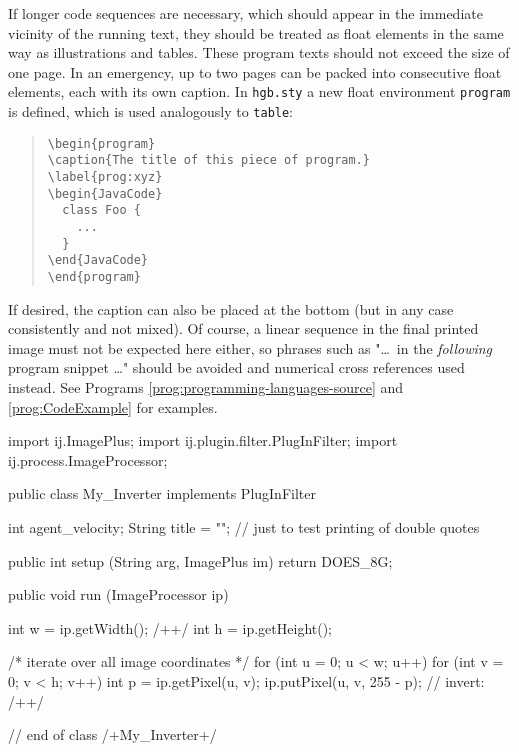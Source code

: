 If longer code sequences are necessary, which should appear in the immediate
vicinity of the running text, they should be treated as float elements in the
same way as illustrations and tables. These program texts should not exceed
the size of one page. In an emergency, up to two pages can be packed into
consecutive float elements, each with its own caption. In \texttt{hgb.sty} a
new float environment \texttt{program} is defined, which is used analogously
to \texttt{table}:
%
\begin{quote}
    \begin{verbatim}
\begin{program}
\caption{The title of this piece of program.}
\label{prog:xyz}
\begin{JavaCode}
  class Foo {
    ...
  }
\end{JavaCode}
\end{program}
    \end{verbatim}
\end{quote}
%
If desired, the caption can also be placed at the bottom (but in any case
consistently and not mixed). Of course, a linear sequence in the final
printed image must not be expected here either, so phrases such as "\ldots\
in the \emph{following} program snippet \ldots" should be avoided and
numerical cross references used instead. See Programs
\ref{prog:programming-languages-source} and \ref{prog:CodeExample} for examples.


\begin{program}
    \caption{Example of a program listing (Java) as a float element.}
    \label{prog:CodeExample}
    \begin{JavaCode}
        import ij.ImagePlus;
        import ij.plugin.filter.PlugInFilter;
        import ij.process.ImageProcessor;

        public class My_Inverter implements PlugInFilter {
            int agent_velocity;
            String title = ""; // just to test printing of double quotes

            public int setup (String arg, ImagePlus im) {
                return DOES_8G;
            }

            public void run (ImageProcessor ip) {
                int w = ip.getWidth(); /+\label{ExampleCodeLabel}+/
                int h = ip.getHeight();

                /* iterate over all image coordinates */
                for (int u = 0; u < w; u++) {
                    for (int v = 0; v < h; v++) {
                        int p = ip.getPixel(u, v);
                        ip.putPixel(u, v, 255 - p); // invert: /+\label{MathInCode}+/
                    }
                }
            }
        } // end of class /+My\_Inverter+/
    \end{JavaCode}
%
\end{program}

